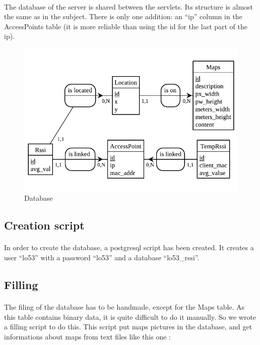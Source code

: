 \paragraph{}
The database of the server is shared between the servlets. Its structure is
almost the same as in the subject. There is only one addition: an ``ip'' column
in the AccessPoints table (it is more reliable than using the id for the last
part of the ip).

\begin{figure}[h]
  \centering
  \includegraphics[scale=1]{./positioning_server/db.pdf}
  \caption{Database}
\end{figure}

        \subsection{Creation script}

\paragraph{}
In order to create the database, a postgresql script has been created. It
creates a user ``lo53'' with a password ``lo53'' and a database ``lo53\_rssi''.

        \subsection{Filling}

\paragraph{}
The filing of the database has to be handmade, except for the Maps table. As
this table contains binary data, it is quite difficult to do it manually. So we
wrote a filling script to do this. This script put maps pictures in the
database, and get informations about maps from text files like this one :

